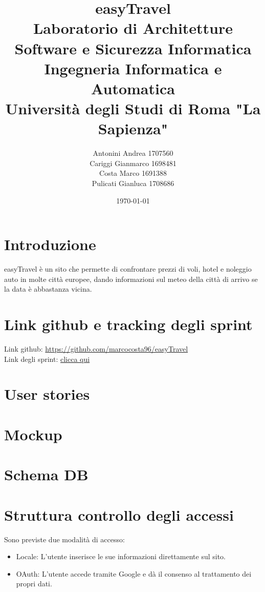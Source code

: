 \documentclass[11pt]{article}
\title{\textbf{easyTravel} \\ \bigskip \large Laboratorio di Architetture Software e Sicurezza Informatica \\ Ingegneria Informatica e Automatica \\ Università degli Studi di Roma "La Sapienza"}
\author{Antonini Andrea 1707560\\Cariggi Gianmarco 1698481\\Costa Marco 1691388\\Pulicati Gianluca 1708686}
\date{\today}
\begin{document}
\maketitle

\tableofcontents

\section{Introduzione}

easyTravel è un sito che permette di confrontare prezzi di voli, hotel e noleggio auto in molte
città europee, dando informazioni sul meteo della città di arrivo se la data è abbastanza vicina.

\section{Link github e tracking degli sprint}

Link github: \href{https://github.com/marcocosta96/easyTravel}{https://github.com/marcocosta96/easyTravel} \\
Link degli sprint: \href{https://docs.google.com/spreadsheets/d/14VnUUgNbMTW1_EG6KlEAEggAsf6aBKnaC1etXz5ji0I/edit#gid=12}{clicca qui} %

\section{User stories}

\section{Mockup}

\section{Schema DB}

\section{Struttura controllo degli accessi}
Sono previste due modalità di accesso:
\begin{itemize}
	\item Locale: L’utente inserisce le sue informazioni direttamente sul sito.
	\item OAuth: L’utente accede tramite Google e dà il consenso al trattamento dei propri dati.
\end{itemize}
\end{document}
